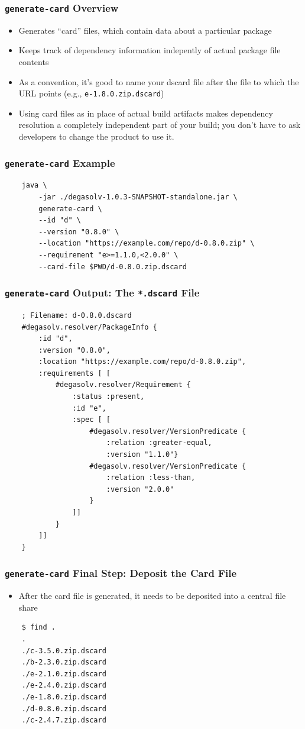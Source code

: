 \documentclass{beamer}
\begin{document}
\begin{frame}
  \frametitle{\texttt{generate-card} Overview}
  \begin{itemize}
  \item Generates ``card'' files, which contain data about a particular package
  \item Keeps track of dependency information indepently of actual package file contents
  \item As a convention, it's good to name your dscard file after the file to which
    the URL points (e.g., \texttt{e-1.8.0.zip.dscard})
  \item Using card files as in place of actual build artifacts makes
    dependency resolution a completely independent part of your build; you
    don't have to ask developers to change the product to use it.
  \end{itemize}
\end{frame}
\begin{frame}[fragile]
  \frametitle{\texttt{generate-card} Example}
\begin{verbatim}
    java \
        -jar ./degasolv-1.0.3-SNAPSHOT-standalone.jar \
        generate-card \
        --id "d" \
        --version "0.8.0" \
        --location "https://example.com/repo/d-0.8.0.zip" \
        --requirement "e>=1.1.0,<2.0.0" \
        --card-file $PWD/d-0.8.0.zip.dscard
\end{verbatim}
\end{frame}
\begin{frame}[fragile]
  \frametitle{\texttt{generate-card} Output: The \texttt{*.dscard} File}
\begin{verbatim}
    ; Filename: d-0.8.0.dscard
    #degasolv.resolver/PackageInfo {
        :id "d",
        :version "0.8.0", 
        :location "https://example.com/repo/d-0.8.0.zip", 
        :requirements [ [
            #degasolv.resolver/Requirement {
                :status :present,
                :id "e", 
                :spec [ [
                    #degasolv.resolver/VersionPredicate {
                        :relation :greater-equal, 
                        :version "1.1.0"}
                    #degasolv.resolver/VersionPredicate {
                        :relation :less-than,
                        :version "2.0.0"
                    }
                ]]
            }
        ]]
    }
\end{verbatim}
\end{frame}
\begin{frame}[fragile]
  \frametitle{\texttt{generate-card} Final Step: Deposit the Card File}
  \begin{itemize}
  \item After the card file is generated, it needs to be deposited into a
    central file share
  \end{itemize}
\begin{verbatim}
    $ find .
    .
    ./c-3.5.0.zip.dscard
    ./b-2.3.0.zip.dscard
    ./e-2.1.0.zip.dscard
    ./e-2.4.0.zip.dscard
    ./e-1.8.0.zip.dscard
    ./d-0.8.0.zip.dscard
    ./c-2.4.7.zip.dscard
\end{verbatim}
\end{frame}
\end{document}
